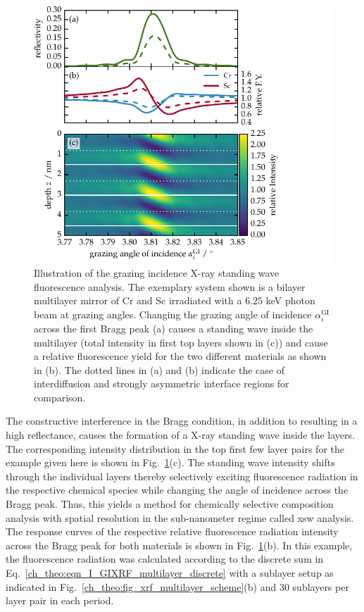 \begin{figure}[htb]
        \includegraphics{img/XRF_scheme}
        \caption[X-ray standing wave fluorescence principle.]{%
            Illustration of the grazing incidence X-ray standing wave fluorescence analysis. The exemplary system shown is a bilayer multilayer mirror of Cr and Sc irradiated with a $6.25$ keV photon beam at grazing angles. Changing the grazing angle of incidence $\alpha_i^\text{GI}$ across the first Bragg peak (a) causes a standing wave inside the multilayer (total intensity in first top layers shown in (c)) and cause a relative fluorescence yield for the two different materials as shown in (b). The dotted lines in (a) and (b) indicate the case of interdiffusion and strongly asymmetric interface regions for comparison.}
        \label{ch_theo:fig_xrf_scheme}
\end{figure}

The constructive interference in the Bragg condition, in addition to resulting in a high reflectance, causes the formation of a X-ray standing wave inside the layers. The corresponding intensity distribution in the top first few layer pairs for the example given here is shown in Fig.~\ref{ch_theo:fig_xrf_scheme}(c). The standing wave intensity shifts through the individual layers thereby selectively exciting fluorescence radiation in the respective chemical species while changing the angle of incidence across the Bragg peak. Thus, this yields a method for chemically selective composition analysis with spatial resolution in the sub-nanometer regime called \gls{xsw} analysis. The response curves of the respective relative fluorescence radiation intensity across the Bragg peak for both materials is shown in Fig.~\ref{ch_theo:fig_xrf_scheme}(b). In this example, the fluorescence radiation was calculated according to the discrete sum in Eq.~\eqref{ch_theo:eqn_I_GIXRF_multilayer_discrete} with a sublayer setup as indicated in Fig.~\ref{ch_theo:fig_xrf_multilayer_scheme}(b) and $30$ sublayers per layer pair in each period.

